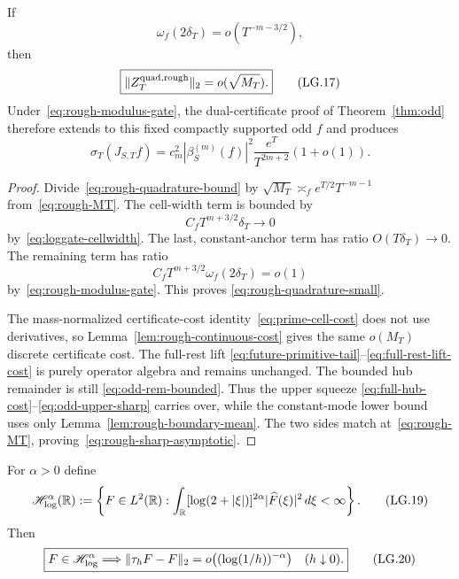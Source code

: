 \begin{proposition}
\label{prop:rough-modulus-gate}
If
\[
 \boxed{
 \omega_f(2\delta_T)=o(T^{-m-3/2}),
 }
\tag{LG.16}\label{eq:rough-modulus-gate}
\]
then
\[
 \boxed{\|Z_T^{\rm quad,rough}\|_2=o(\sqrt{M_T}).}
\tag{LG.17}\label{eq:rough-quadrature-small}
\]
Under~\eqref{eq:rough-modulus-gate}, the dual-certificate proof of
Theorem~\ref{thm:odd} therefore extends to this fixed compactly supported odd $f$ and
produces
\[
 \boxed{
 \sigma_T(J_{S,T}f)
 =c_m^2|\beta_S^{(m)}(f)|^2
 \frac{e^T}{T^{2m+2}}(1+o(1)).
 }
\tag{LG.18}\label{eq:rough-sharp-asymptotic}
\]
\end{proposition}

\begin{proof}
Divide~\eqref{eq:rough-quadrature-bound} by
$\sqrt{M_T}\asymp_f e^{T/2}T^{-m-1}$ from~\eqref{eq:rough-MT}.  The cell-width term is
bounded by
\[
 C_f T^{m+3/2}\delta_T\longrightarrow0
\]
by~\eqref{eq:loggate-cellwidth}.  The last, constant-anchor term has ratio
$O(T\delta_T)\to0$.  The remaining term has ratio
\[
 C_fT^{m+3/2}\omega_f(2\delta_T)=o(1)
\]
by~\eqref{eq:rough-modulus-gate}.  This proves
\eqref{eq:rough-quadrature-small}.

The mass-normalized certificate-cost identity~\eqref{eq:prime-cell-cost} does not use
derivatives, so Lemma~\ref{lem:rough-continuous-cost} gives the same
$o(M_T)$ discrete certificate cost.  The full-rest lift
\eqref{eq:future-primitive-tail}--\eqref{eq:full-rest-lift-cost} is purely operator
algebra and remains unchanged.  The bounded hub remainder is still
\eqref{eq:odd-rem-bounded}.  Thus the upper squeeze
\eqref{eq:full-hub-cost}--\eqref{eq:odd-upper-sharp} carries over, while the
constant-mode lower bound uses only Lemma~\ref{lem:rough-boundary-mean}.  The two sides
match at~\eqref{eq:rough-MT}, proving~\eqref{eq:rough-sharp-asymptotic}.
\end{proof}

\begin{lemma}
\label{lem:log-translation}
For $\alpha>0$ define
\[
 \mathscr H_{\log}^\alpha(\mathbb R)
 :=\left\{F\in L^2(\mathbb R):
 \int_{\mathbb R}[\log(2+|\xi|)]^{2\alpha}
 |\widehat F(\xi)|^2\,d\xi<\infty\right\}.
\tag{LG.19}\label{eq:log-space}
\]
Then
\[
 \boxed{
 F\in\mathscr H_{\log}^\alpha
 \Longrightarrow
 \|\tau_hF-F\|_2
 =o\bigl((\log(1/h))^{-\alpha}\bigr)
 \quad(h\downarrow0).
 }
\tag{LG.20}\label{eq:log-translation}
\]
\end{lemma}

